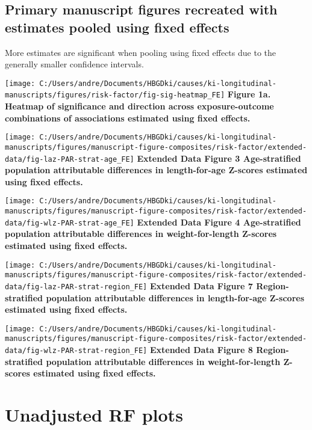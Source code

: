 \documentclass[9pt,]{book}
\begin{document}
\section{Primary manuscript figures recreated with estimates pooled
using fixed
effects}\label{primary-manuscript-figures-recreated-with-estimates-pooled-using-fixed-effects}

More estimates are significant when pooling using fixed effects due to
the generally smaller confidence intervals.

\texttt{[image: C:/Users/andre/Documents/HBGDki/causes/ki-longitudinal-manuscripts/figures/risk-factor/fig-sig-heatmap\_FE]}
\textbf{Figure 1a. Heatmap of significance and direction across
exposure-outcome combinations of associations estimated using fixed
effects. }

\texttt{[image: C:/Users/andre/Documents/HBGDki/causes/ki-longitudinal-manuscripts/figures/manuscript-figure-composites/risk-factor/extended-data/fig-laz-PAR-strat-age\_FE]}
\textbf{Extended Data Figure 3 \textbar{} Age-stratified population
attributable differences in length-for-age Z-scores estimated using
fixed effects. }

\texttt{[image: C:/Users/andre/Documents/HBGDki/causes/ki-longitudinal-manuscripts/figures/manuscript-figure-composites/risk-factor/extended-data/fig-wlz-PAR-strat-age\_FE]}
\textbf{Extended Data Figure 4 \textbar{} Age-stratified population
attributable differences in weight-for-length Z-scores estimated using
fixed effects. }

\texttt{[image: C:/Users/andre/Documents/HBGDki/causes/ki-longitudinal-manuscripts/figures/manuscript-figure-composites/risk-factor/extended-data/fig-laz-PAR-strat-region\_FE]}
\textbf{Extended Data Figure 7 \textbar{} Region-stratified population
attributable differences in length-for-age Z-scores estimated using
fixed effects. }

\texttt{[image: C:/Users/andre/Documents/HBGDki/causes/ki-longitudinal-manuscripts/figures/manuscript-figure-composites/risk-factor/extended-data/fig-wlz-PAR-strat-region\_FE]}
\textbf{Extended Data Figure 8 \textbar{} Region-stratified population
attributable differences in weight-for-length Z-scores estimated using
fixed effects. }

\chapter{Unadjusted RF plots}\label{unadjusted}
\end{document}
